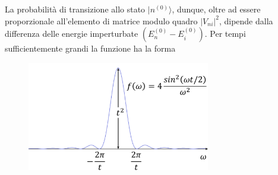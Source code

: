 La probabilità di transizione allo stato $\vert n ^{(0)} \rangle$, dunque, oltre ad essere proporzionale all'elemento di matrice modulo quadro $\vert V_{ni}\vert ^2$, dipende dalla differenza delle energie imperturbate $(E_n ^{(0)} - E_i ^{(0)}) $. Per tempi sufficientemente grandi la funzione ha la forma
\begin{figure}[!htbp]
\begin{center}
\includegraphics[width=8cm]{immagini/cap_15/fig_15_1.png}
\end{center}
\end{figure}

